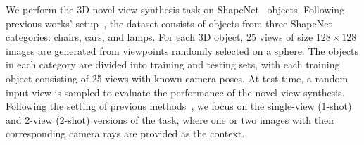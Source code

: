  We perform the 3D novel view synthesis task on ShapeNet~\citep{chang2015shapenet} objects. Following previous works' setup~\citep{tancik2021learned}, the dataset consists of objects from three ShapeNet categories: chairs, cars, and lamps. For each 3D object, 25 views of size \(128 \times 128\) images are generated from viewpoints randomly selected on a sphere. The objects in each category are divided into training and testing sets, with each training object consisting of 25 views with known camera poses. At test time, a random input view is sampled to evaluate the performance of the novel view synthesis. Following the setting of previous methods~\citep{chen2022transformers}, we focus on the single-view (1-shot) and 2-view (2-shot) versions of the task, where one or two images with their corresponding camera rays are provided as the context.


